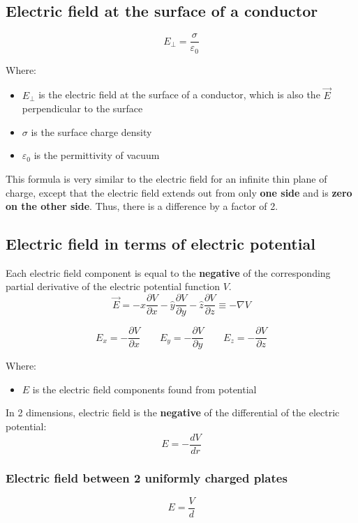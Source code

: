\documentclass[11pt]{article}
\begin{document}
\subsection{Electric field at the surface of a conductor}
\label{sec:orge8c5509}
\[E_{\perp} = \frac{\sigma}{\varepsilon_0}\]

Where:
\begin{itemize}
\item \(E_{\perp}\) is the electric field at the surface of a conductor, which is also the \(\vec{E}\) perpendicular to the surface
\item \(\sigma\) is the surface charge density
\item \(\varepsilon_0\) is the permittivity of vacuum
\end{itemize}

This formula is very similar to the electric field for an infinite thin plane of charge, except that the electric field extends out from only \textbf{one side} and is \textbf{zero on the other side}. Thus, there is a difference by a factor of 2.

\subsection{Electric field in terms of electric potential}
\label{sec:orgc31b78e}
Each electric field component is equal to the \textbf{negative} of the corresponding partial derivative of the electric potential function \(V\).
\[\vec{E} = - \hat{x} \frac{\partial V}{\partial x} - \hat{y} \frac{\partial V}{\partial y} - \hat{z} \frac{\partial V}{\partial z} \equiv - \nabla V\]

\[E_x = - \frac{\partial V}{\partial x} \qquad E_y = - \frac{\partial V}{\partial y} \qquad E_z = - \frac{\partial V}{\partial z}\]

Where:
\begin{itemize}
\item \(E\) is the electric field components found from potential
\end{itemize}

In 2 dimensions, electric field is the \textbf{negative} of the differential of the electric potential:
\[E = -\frac{dV}{dr}\]

\subsubsection{Electric field between 2 uniformly charged plates}
\label{sec:orgd02e40e}
\[E = \frac{V}{d}\]
\end{document}
